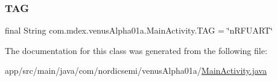 \subsubsection{\texorpdfstring{T\+AG}{TAG}}
{\footnotesize\ttfamily final String com.\+mdex.\+venus\+Alpha01a.\+Main\+Activity.\+T\+AG = \char`\"{}n\+R\+F\+U\+A\+RT\char`\"{}\hspace{0.3cm}{\ttfamily [static]}}



The documentation for this class was generated from the following file\+:\begin{DoxyCompactItemize}
\item 
app/src/main/java/com/nordicsemi/venus\+Alpha01a/\hyperlink{_main_activity_8java}{Main\+Activity.\+java}\end{DoxyCompactItemize}

